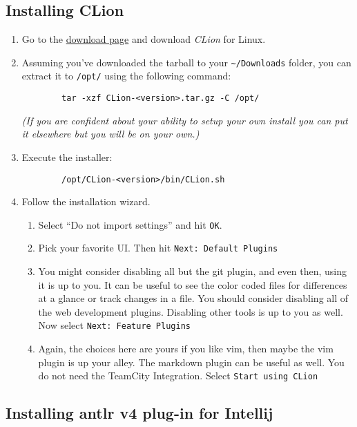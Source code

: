 \documentclass{article}
\begin{document}
\subsection{Installing CLion}
\begin{enumerate}
	\item
    Go to the \href{https://www.jetbrains.com/clion/download/\#section=linux} {download page} and
    download \textit{CLion} for Linux.

	\item
    Assuming you've downloaded the tarball to your \lstinline{~/Downloads} folder, you can extract
    it to \lstinline{/opt/} using the following command:
  	\begin{lstlisting}
  		tar -xzf CLion-<version>.tar.gz -C /opt/
  	\end{lstlisting}
  	\textit{(If you are confident about your ability to setup your own install you can put it
    elsewhere but you will be on your own.)}
	\item
    Execute the installer:
  	\begin{lstlisting}
  		/opt/CLion-<version>/bin/CLion.sh
  	\end{lstlisting}
	\item
    Follow the installation wizard.
  	\begin{enumerate}
  		\item
        Select ``Do not import settings'' and hit \texttt{OK}.
  		\item
        Pick your favorite UI. Then hit \texttt{Next: Default Plugins}
  		\item
        You might consider disabling all but the git plugin, and even then, using it is up to you.
        It can be useful to see the color coded files for differences at a glance or track changes
        in a file. You should consider disabling all of the web development plugins. Disabling
        other tools is up to you as well. Now select \texttt{Next: Feature Plugins}
  		\item
        Again, the choices here are yours if you like vim, then maybe the vim plugin is up your
        alley. The markdown plugin can be useful as well. You do not need the TeamCity Integration.
        Select \texttt{Start using CLion}
  	\end{enumerate}
\end{enumerate}
	\subsection{Installing antlr v4 plug-in for Intellij}
\end{document}
